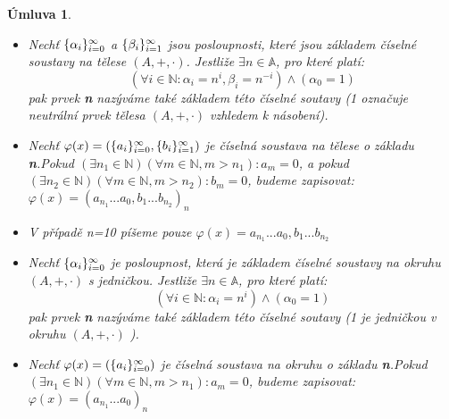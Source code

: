 \documentclass[12pt]{book}
\newtheorem{umluva}{Úmluva}
\begin{document}
\begin{umluva}\label{u1} \textbf \newline
	\begin{itemize}
		\item Nechť $\{\alpha_i\}_{i=0}^{\infty}$ a $\{\beta_i\}_{i=1}^{\infty}$  jsou posloupnosti, které jsou základem číselné soustavy na tělese $(A,+,\cdot)$. Jestliže $\exists n \in \mathbb{A}$, pro které platí:
	$$ (\forall i \in \mathbb{N} : \alpha_i = n^i,\beta_i = n^{-i}) \land (\alpha_{0} = 1)$$
	pak prvek \textbf{n} nazýváme také základem této číselné soutavy (1 označuje neutrální prvek tělesa $(A,+,\cdot)$ vzhledem k násobení).
	\item Nechť $\varphi(x) = (\{a_i\}_{i=0}^{\infty},\{b_i\}_{i=1}^{\infty})$ je číselná soustava na tělese o základu \textbf{n}.\newline Pokud $(\exists n_1 \in \mathbb{N}) (\forall m \in \mathbb{N},m>n_1):a_m = 0$, a pokud $(\exists n_2 \in \mathbb{N}) (\forall m \in \mathbb{N},m>n_2):b_m = 0$, budeme zapisovat: $\varphi(x) = (a_{n_1} ... a_0,b_1 ... b_{n_2})_n$
	\item V případě n=10 píšeme pouze $\varphi(x) = a_{n_1} ... a_0,b_1 ... b_{n_2}$
	\item Nechť $\{\alpha_i\}_{i=0}^{\infty}$ je posloupnost, která je základem číselné soustavy na okruhu $(A,+,\cdot)$ s jedničkou. Jestliže $\exists n \in \mathbb{A}$, pro které platí:
	$$ (\forall i \in \mathbb{N} : \alpha_i = n^i) \land (\alpha_{0} = 1)$$
	pak prvek \textbf{n} nazýváme také základem této číselné soutavy (1 je jedničkou v okruhu $(A,+,\cdot)$ ).
	\item Nechť $\varphi(x) = (\{a_i\}_{i=0}^{\infty})$ je číselná soustava na okruhu o základu \textbf{n}.\newline Pokud $(\exists n_1 \in \mathbb{N}) (\forall m \in \mathbb{N},m>n_1):a_m = 0$, budeme zapisovat: $\varphi(x) = (a_{n_1} ... a_0)_n$
\end{itemize}
\end{umluva}

\newpage
\end{document}
